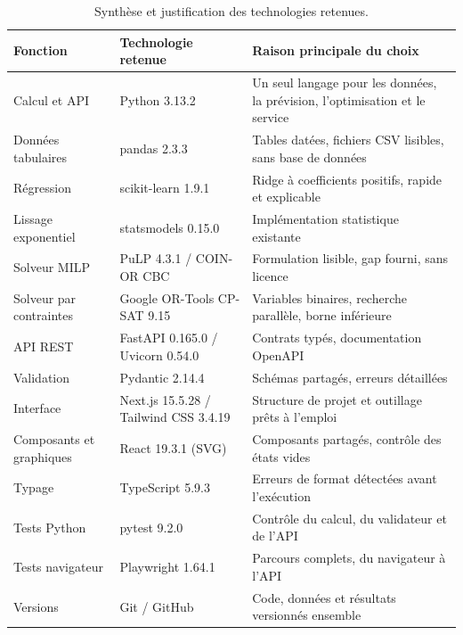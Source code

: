 \begin{table}[H]
\centering
\small
\renewcommand{\arraystretch}{1.25}
\begin{tabularx}{\linewidth}{>{\raggedright\arraybackslash}p{3.2cm} >{\raggedright\arraybackslash}p{4.6cm} >{\raggedright\arraybackslash}X}
\toprule
\textbf{Fonction} & \textbf{Technologie retenue} & \textbf{Raison principale du choix} \\
\midrule
Calcul et API & Python 3.13.2 & Un seul langage pour les données, la prévision, l'optimisation et le service \\
Données tabulaires & pandas 2.3.3 & Tables datées, fichiers CSV lisibles, sans base de données \\
Régression & scikit-learn 1.9.1 & Ridge à coefficients positifs, rapide et explicable \\
Lissage exponentiel & statsmodels 0.15.0 & Implémentation statistique existante \\
Solveur MILP & PuLP 4.3.1 / COIN-OR CBC & Formulation lisible, gap fourni, sans licence \\
Solveur par contraintes & Google OR-Tools CP-SAT 9.15 & Variables binaires, recherche parallèle, borne inférieure \\
API REST & FastAPI 0.165.0 / Uvicorn 0.54.0 & Contrats typés, documentation OpenAPI \\
Validation & Pydantic 2.14.4 & Schémas partagés, erreurs détaillées \\
Interface & Next.js 15.5.28 / Tailwind CSS 3.4.19 & Structure de projet et outillage prêts à l'emploi \\
Composants et graphiques & React 19.3.1 (SVG) & Composants partagés, contrôle des états vides \\
Typage & TypeScript 5.9.3 & Erreurs de format détectées avant l'exécution \\
Tests Python & pytest 9.2.0 & Contrôle du calcul, du validateur et de l'API \\
Tests navigateur & Playwright 1.64.1 & Parcours complets, du navigateur à l'API \\
Versions & Git / GitHub & Code, données et résultats versionnés ensemble \\
\bottomrule
\end{tabularx}
\caption{Synthèse et justification des technologies retenues.}
\label{tab:technologies}
\end{table}

